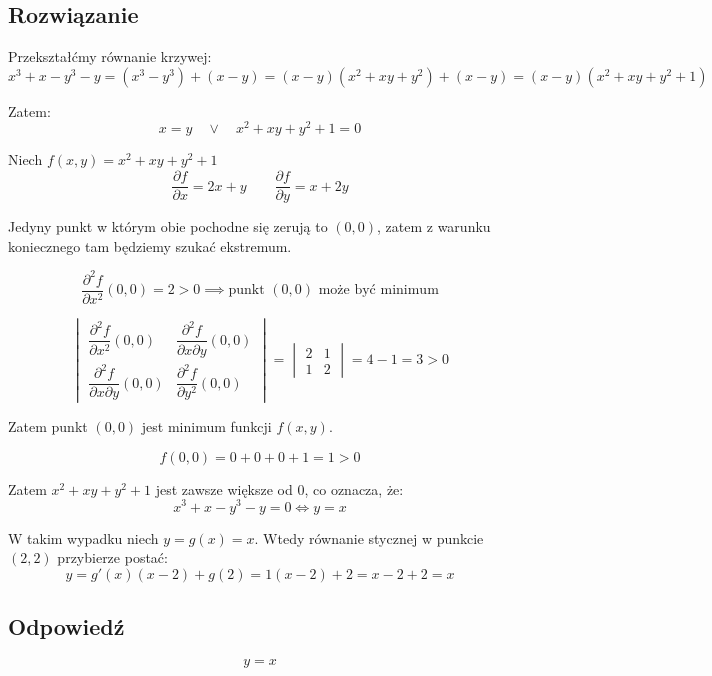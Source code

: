 \documentclass{article}
\newcommand{\partderiv}[2]{\frac{\partial #1}{\partial #2}}
\DeclareMathOperator{\?}{?}
\begin{document}
\subsection*{Rozwiązanie}
Przekształćmy równanie krzywej:
\begin{equation*}
   x^3 + x - y^3 - y = (x^3 - y^3) + (x-y) = (x-y)(x^2 + xy + y^2) + (x-y) =
   (x-y)(x^2 + xy + y^2 + 1)
\end{equation*}

\noindent
Zatem:
\begin{equation*}
   x = y \quad\lor\quad x^2 + xy + y^2 + 1 = 0
\end{equation*}

\noindent
Niech $f(x,y) = x^2 + xy + y^2 + 1$
\begin{equation*}
   \partderiv{f}{x} = 2x + y
   \qquad
   \partderiv{f}{y} = x + 2y
\end{equation*}

\noindent
Jedyny punkt w którym obie pochodne się zerują to $(0,0)$, zatem z warunku
koniecznego tam będziemy szukać ekstremum.

\begin{equation*}
   \frac{\partial^2 f}{\partial x^2}(0,0) = 2 > 0 \implies \textrm{punkt $(0,0)$ może być minimum}
\end{equation*}

\begin{equation*}
   \begin{vmatrix}
      \dfrac{\partial^2 f}{\partial x^2}(0,0) & \dfrac{\partial^2 f}{\partial x \partial y}(0,0) \\[1em]
      \dfrac{\partial^2 f}{\partial x \partial y}(0,0) & \dfrac{\partial^2 f}{\partial y^2}(0,0)
   \end{vmatrix}
   =
   \begin{vmatrix}
      2 & 1 \\
      1 & 2
   \end{vmatrix}
   = 4 - 1 = 3 > 0
\end{equation*}

\noindent
Zatem punkt $(0,0)$ jest minimum funkcji $f(x,y)$.

\begin{equation*}
   f(0,0) = 0 + 0 + 0 + 1 = 1 > 0
\end{equation*}

\noindent
Zatem $x^2 + xy + y^2 + 1$ jest zawsze większe od $0$, co oznacza, że:
\begin{equation*}
   x^3 + x - y^3 - y = 0 \Leftrightarrow y = x
\end{equation*}

W takim wypadku niech $y = g(x) = x$. Wtedy równanie stycznej w punkcie $(2,2)$
przybierze postać:
\begin{equation*}
   y = g'(x)(x - 2) + g(2) = 1(x - 2) + 2 = x - 2 + 2 = x
\end{equation*}

\subsection*{Odpowiedź}
\begin{equation*}
   y = x
\end{equation*}
\end{document}
